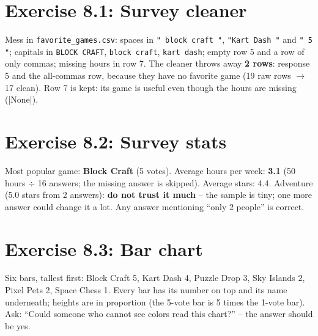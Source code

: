 
\section{Exercise 8.1: Survey cleaner}
\begin{answer}[Answers]
Mess in \texttt{favorite\_games.csv}: spaces in \texttt{" block craft "}, \texttt{"Kart Dash "} and \texttt{" 5 "}; capitals in \texttt{BLOCK CRAFT}, \texttt{block craft}, \texttt{kart dash}; empty row 5 and a row of only commas; missing hours in row 7.
The cleaner throws away \textbf{2 rows}: response 5 and the all-commas row, because they have no favorite game (19 raw rows $\rightarrow$ 17 clean). Row 7 is kept: its game is useful even though the hours are missing (\py|None|).
\end{answer}

\section{Exercise 8.2: Survey stats}
\begin{answer}[Answers]
Most popular game: \textbf{Block Craft} (5 votes). Average hours per week: \textbf{3.1} (50 hours $\div$ 16 answers; the missing answer is skipped). Average stars: 4.4.
Adventure (5.0 stars from 2 answers): \textbf{do not trust it much} -- the sample is tiny; one more answer could change it a lot. Any answer mentioning \enquote{only 2 people} is correct.
\end{answer}

\section{Exercise 8.3: Bar chart}
\begin{answer}
Six bars, tallest first: Block Craft 5, Kart Dash 4, Puzzle Drop 3, Sky Islands 2, Pixel Pets 2, Space Chess 1. Every bar has its number on top and its name underneath; heights are in proportion (the 5-vote bar is 5 times the 1-vote bar). Ask: \enquote{Could someone who cannot see colors read this chart?} -- the answer should be yes.
\end{answer}

